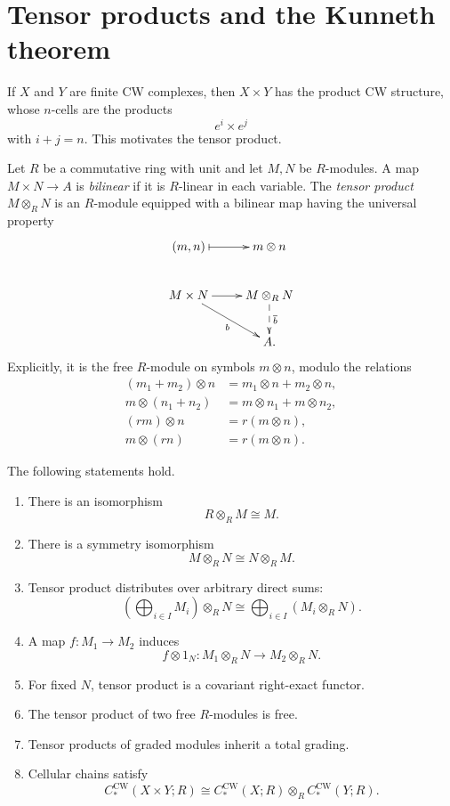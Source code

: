 \section{Tensor products and the Kunneth
theorem}
\label{at-section-kunneth}

\noindent
If $X$ and $Y$ are finite CW complexes,
then $X\times Y$ has the product CW
structure, whose $n$-cells are the products
$$
e^i\times e^j
$$
with $i+j=n$.  This motivates the tensor
product.

\begin{definition}
\label{at-definition-tensor-product}
Let $R$ be a commutative ring with unit and
let $M,N$ be $R$-modules.  A map
$M\times N\to A$ is {\it bilinear} if it
is $R$-linear in each variable.  The
{\it tensor product} $M\otimes_RN$ is an
$R$-module equipped with a bilinear map
having the universal property
$$
\xymatrix{
(m,n) \ar@{|->}[r]
  & m\otimes n \\
M\times N \ar[r]
  \ar[rd]_-b
  & M\otimes_RN
    \ar@{-->}[d]^{\overline b} \\
  & A.
}
$$
Explicitly, it is the free $R$-module on
symbols $m\otimes n$, modulo the relations
$$
\begin{aligned}
(m_1+m_2)\otimes n
&=m_1\otimes n+m_2\otimes n,
\\
m\otimes(n_1+n_2)
&=m\otimes n_1+m\otimes n_2,
\\
(rm)\otimes n
&=r(m\otimes n),
\\
m\otimes(rn)
&=r(m\otimes n).
\end{aligned}
$$
\end{definition}

\begin{proposition}
\label{at-proposition-tensor-properties}
The following statements hold.
\begin{enumerate}
\item There is an isomorphism
$$
R\otimes_RM\cong M.
$$
\item There is a symmetry isomorphism
$$
M\otimes_RN\cong N\otimes_RM.
$$
\item Tensor product distributes over
arbitrary direct sums:
$$
\left(\bigoplus_{i\in I}M_i\right)
\otimes_RN
\cong
\bigoplus_{i\in I}(M_i\otimes_RN).
$$
\item A map $f:M_1\to M_2$ induces
$$
f\otimes1_N:
M_1\otimes_RN\longrightarrow M_2\otimes_RN.
$$
\item For fixed $N$, tensor product is a
covariant right-exact functor.
\item The tensor product of two free
$R$-modules is free.
\item Tensor products of graded modules
inherit a total grading.
\item Cellular chains satisfy
$$
C_*^{\mathrm{CW}}(X\times Y;R)
\cong
C_*^{\mathrm{CW}}(X;R)
\otimes_R C_*^{\mathrm{CW}}(Y;R).
$$
\end{enumerate}
\end{proposition}

